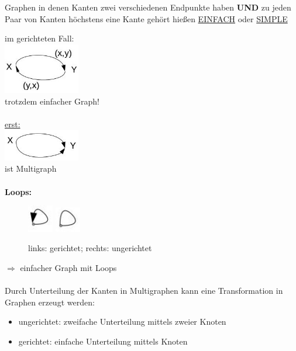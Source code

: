 Graphen in denen Kanten zwei verschiedenen Endpunkte haben \textbf{UND} zu jeden Paar von Kanten höchstens eine Kante gehört hießen \underline{EINFACH} oder \underline{SIMPLE}

im gerichteten Fall:\\
\includegraphics[width=0.25\textwidth]{lectures/161014/pix/1.jpg}
\\
trotzdem einfacher Graph!\\
\\
\underline{erst:}\\
\includegraphics[width=0.25\textwidth]{lectures/161014/pix/2.jpg}
\\
ist Multigraph
\\\\
\textbf{Loops:}
\begin{figure}[ht]
	\centering
  	\includegraphics[width=0.1\textwidth]{lectures/161014/pix/3.jpg}
  	\includegraphics[width=0.1\textwidth]{lectures/161014/pix/4.jpg}
	\caption{links: gerichtet; rechts: ungerichtet}
\end{figure}

$\Rightarrow$ einfacher Graph mit Loops
\\\\
Durch Unterteilung der Kanten in Multigraphen kann eine Transformation in Graphen erzeugt werden:
\begin{itemize}
	\item ungerichtet: zweifache Unterteilung mittels zweier Knoten
	\item gerichtet: einfache Unterteilung mittels Knoten
\end{itemize}

